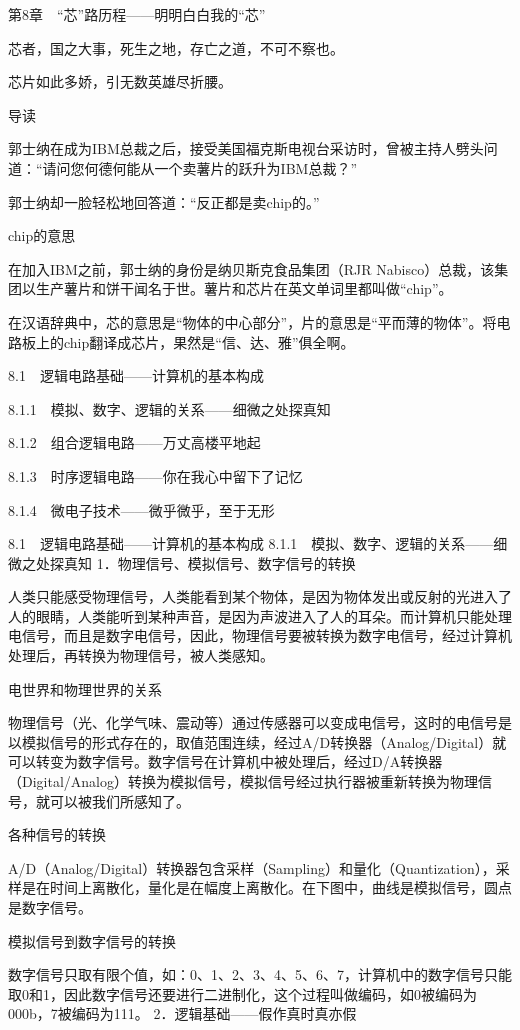 \documentclass[12pt,UTF8]{ctexbook}
\begin{document}
第8章　“芯”路历程——明明白白我的“芯”

芯者，国之大事，死生之地，存亡之道，不可不察也。

芯片如此多娇，引无数英雄尽折腰。



导读

郭士纳在成为IBM总裁之后，接受美国福克斯电视台采访时，曾被主持人劈头问道：“请问您何德何能从一个卖薯片的跃升为IBM总裁？”

郭士纳却一脸轻松地回答道：“反正都是卖chip的。”

chip的意思

在加入IBM之前，郭士纳的身份是纳贝斯克食品集团（RJR Nabisco）总裁，该集团以生产薯片和饼干闻名于世。薯片和芯片在英文单词里都叫做“chip”。

在汉语辞典中，芯的意思是“物体的中心部分”，片的意思是“平而薄的物体”。将电路板上的chip翻译成芯片，果然是“信、达、雅”俱全啊。


8.1　逻辑电路基础——计算机的基本构成

8.1.1　模拟、数字、逻辑的关系——细微之处探真知

8.1.2　组合逻辑电路——万丈高楼平地起

8.1.3　时序逻辑电路——你在我心中留下了记忆

8.1.4　微电子技术——微乎微乎，至于无形


8.1　逻辑电路基础——计算机的基本构成
8.1.1　模拟、数字、逻辑的关系——细微之处探真知
1．物理信号、模拟信号、数字信号的转换

人类只能感受物理信号，人类能看到某个物体，是因为物体发出或反射的光进入了人的眼睛，人类能听到某种声音，是因为声波进入了人的耳朵。而计算机只能处理电信号，而且是数字电信号，因此，物理信号要被转换为数字电信号，经过计算机处理后，再转换为物理信号，被人类感知。

电世界和物理世界的关系

物理信号（光、化学气味、震动等）通过传感器可以变成电信号，这时的电信号是以模拟信号的形式存在的，取值范围连续，经过A/D转换器（Analog/Digital）就可以转变为数字信号。数字信号在计算机中被处理后，经过D/A转换器（Digital/Analog）转换为模拟信号，模拟信号经过执行器被重新转换为物理信号，就可以被我们所感知了。

各种信号的转换

A/D（Analog/Digital）转换器包含采样（Sampling）和量化（Quantization），采样是在时间上离散化，量化是在幅度上离散化。在下图中，曲线是模拟信号，圆点是数字信号。

模拟信号到数字信号的转换

数字信号只取有限个值，如：0、1、2、3、4、5、6、7，计算机中的数字信号只能取0和1，因此数字信号还要进行二进制化，这个过程叫做编码，如0被编码为000b，7被编码为111。
2．逻辑基础——假作真时真亦假
\end{document}
